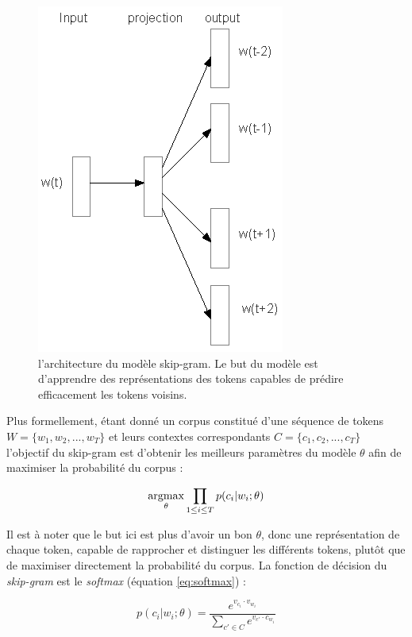 \documentclass[citation\_needed]{subfiles}
\begin{document}
\begin{figure}[ht!]
    \centering
    \includegraphics[scale=1.2]{images/NN/word2vec/skipgram}
    \caption{l'architecture du modèle skip-gram. Le but du modèle est d'apprendre des représentations des tokens capables de prédire efficacement les tokens voisins.}
    \label{fig:skipgram}
\end{figure}

Plus formellement, étant donné un corpus constitué d'une séquence de tokens $W = \{w_{1}, w_{2}, ..., w_{T}\}$ et leurs contextes correspondants $C = \{c_{1}, c_{2}, ..., c_{T}\}$ l'objectif du skip-gram est d'obtenir les meilleurs paramètres du modèle $\theta$ afin de maximiser la probabilité du corpus :

\begin{equation}\label{eq:skipgram}
\underset{\theta}{\operatorname{argmax}} \prod_{1 \leq i \leq T} p(c_{i}|w_{i};\theta)
\end{equation}

Il est à noter que le but ici est plus d'avoir un bon $\theta$, donc une représentation de chaque token, capable de rapprocher et distinguer les différents tokens, plutôt que de maximiser directement la probabilité du corpus. La fonction de décision du \textit{skip-gram} est le \textit{softmax} (équation \ref{eq:softmax}) :

\begin{equation}\label{eq:skipgram-softmax}
p(c_{i}|w_{i};\theta) = \frac{e^{v_{c_{i}} \cdot v_{w_{i}}}}{\sum_{c' \in C} e^{v_{c'} \cdot c_{w_{i}}}}
\end{equation}
\end{document}

